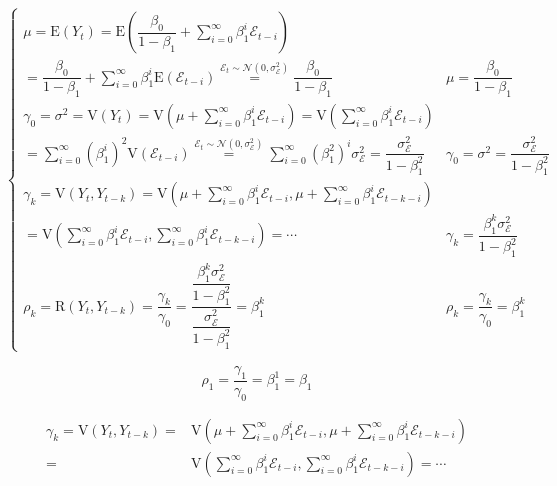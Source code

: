 \documentclass[
]{book}
\theoremstyle{definition}
\theoremstyle{definition}
\theoremstyle{definition}
\theoremstyle{definition}
\theoremstyle{remark}
\begin{document}
\[
\begin{cases}
\mu=\mathrm{E}\left(Y_{t}\right)=\mathrm{E}\left(\dfrac{\beta_{0}}{1-\beta_{1}}+\sum\limits _{i=0}^{\infty}\beta_{1}^{i}\mathcal{E}_{t-i}\right)\\
=\dfrac{\beta_{0}}{1-\beta_{1}}+\sum\limits _{i=0}^{\infty}\beta_{1}^{i}\mathrm{E}\left(\mathcal{E}_{t-i}\right)\overset{\mathcal{E}_{t}\sim\mathcal{N}\left(0,\sigma_{\mathcal{E}}^{2}\right)}{=}\dfrac{\beta_{0}}{1-\beta_{1}} & \mu=\dfrac{\beta_{0}}{1-\beta_{1}}\\
\gamma_{0}=\sigma^{2}=\mathrm{V}\left(Y_{t}\right)=\mathrm{V}\left(\mu+\sum\limits _{i=0}^{\infty}\beta_{1}^{i}\mathcal{E}_{t-i}\right)=\mathrm{V}\left(\sum\limits _{i=0}^{\infty}\beta_{1}^{i}\mathcal{E}_{t-i}\right)\\
=\sum_{i=0}^{\infty}\left(\beta_{1}^{i}\right)^{2}\mathrm{V}\left(\mathcal{E}_{t-i}\right)\overset{\mathcal{E}_{t}\sim\mathcal{N}\left(0,\sigma_{\mathcal{E}}^{2}\right)}{=}\sum\limits _{i=0}^{\infty}\left(\beta_{1}^{2}\right)^{i}\sigma_{\mathcal{E}}^{2}=\dfrac{\sigma_{\mathcal{E}}^{2}}{1-\beta_{1}^{2}} & \gamma_{0}=\sigma^{2}=\dfrac{\sigma_{\mathcal{E}}^{2}}{1-\beta_{1}^{2}}\\
\gamma_{k}=\mathrm{V}\left(Y_{t},Y_{t-k}\right)=\mathrm{V}\left(\mu+\sum\limits _{i=0}^{\infty}\beta_{1}^{i}\mathcal{E}_{t-i},\mu+\sum\limits _{i=0}^{\infty}\beta_{1}^{i}\mathcal{E}_{t-k-i}\right)\\
=\mathrm{V}\left(\sum\limits _{i=0}^{\infty}\beta_{1}^{i}\mathcal{E}_{t-i},\sum\limits _{i=0}^{\infty}\beta_{1}^{i}\mathcal{E}_{t-k-i}\right)=\cdots & \gamma_{k}=\dfrac{\beta_{1}^{k}\sigma_{\mathcal{E}}^{2}}{1-\beta_{1}^{2}}\\
\rho_{k}=\mathrm{R}\left(Y_{t},Y_{t-k}\right)=\dfrac{\gamma_{k}}{\gamma_{0}}=\dfrac{\dfrac{\beta_{1}^{k}\sigma_{\mathcal{E}}^{2}}{1-\beta_{1}^{2}}}{\dfrac{\sigma_{\mathcal{E}}^{2}}{1-\beta_{1}^{2}}}=\beta_{1}^{k} & \rho_{k}=\dfrac{\gamma_{k}}{\gamma_{0}}=\beta_{1}^{k}
\end{cases}
\]

\[
\rho_{1}=\dfrac{\gamma_{1}}{\gamma_{0}}=\beta_{1}^{1}=\beta_{1}
\]

\[
\begin{aligned}
\gamma_{k}=\mathrm{V}\left(Y_{t},Y_{t-k}\right)= & \mathrm{V}\left(\mu+\sum\limits _{i=0}^{\infty}\beta_{1}^{i}\mathcal{E}_{t-i},\mu+\sum\limits _{i=0}^{\infty}\beta_{1}^{i}\mathcal{E}_{t-k-i}\right)\\
= & \mathrm{V}\left(\sum\limits _{i=0}^{\infty}\beta_{1}^{i}\mathcal{E}_{t-i},\sum\limits _{i=0}^{\infty}\beta_{1}^{i}\mathcal{E}_{t-k-i}\right)=\cdots
\end{aligned}
\]
\end{document}
